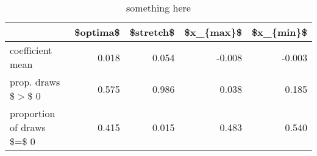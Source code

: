\begin{table}[ht]
\centering
\begin{tabular}{lrrrr}
  \hline
  & \$optima\$ & \$stretch\$ & \$x\_\{max\}\$ & \$x\_\{min\}\$ \\ 
  \hline
coefficient mean & 0.018 & 0.054 & -0.008 & -0.003 \\ 
  prop. draws \$$>$\$ 0 & 0.575 & 0.986 & 0.038 & 0.185 \\ 
  proportion of draws \$=\$ 0 & 0.415 & 0.015 & 0.483 & 0.540 \\ 
   \hline
\end{tabular}
\caption{something here} 
\end{table}
